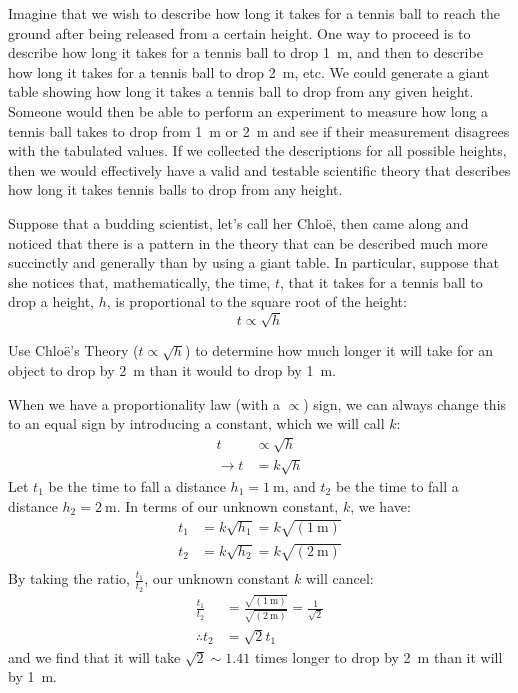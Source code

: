 Imagine that we wish to describe how long it takes for a tennis ball to reach the ground after being released from a certain height. One way to proceed is to describe how long it takes for a tennis ball to drop \SI{1}{\meter}, and then to describe how long it takes for a tennis ball to drop \SI{2}{\meter}, etc. We could generate a giant table showing how long it takes a tennis ball to drop from any given height. Someone would then be able to perform an experiment to measure how long a tennis ball takes to drop from \SI{1}{\meter} or \SI{2}{\meter} and see if their measurement disagrees with the tabulated values. If we collected the descriptions for all possible heights, then we would effectively have a valid and testable scientific theory that describes how long it takes tennis balls to drop from any height.

Suppose that a budding scientist, let's call her Chlo\"e, then came along and noticed that there is a pattern in the theory that can be described much more succinctly and generally than by using a giant table. In particular, suppose that she notices that, mathematically, the time, $t$, that it takes for a tennis ball to drop a height, $h$, is proportional to the square root of the height:
\begin{equation*}
t \propto \sqrt{h}
\end{equation*}

\begin{example}{Use Chlo\"e's Theory ($t \propto \sqrt{h}$) to determine how much longer it will take for an object to drop by \SI{2}{\meter} than it would to drop by \SI{1}{\meter}.}

When we have a proportionality law (with a $\propto$) sign, we can always change this to an equal sign by introducing a constant, which we will call $k$:
\begin{align*}
t &\propto \sqrt{h} \\
\rightarrow t&=k\sqrt{h}
\end{align*}
Let $t_1$ be the time to fall a distance $h_1=\SI{1}{\meter}$, and $t_2$ be the time to fall a distance $h_2=\SI{2}{\meter}$. In terms of our unknown constant, $k$, we have:
\begin{align*}
t_1 &=k\sqrt{h_1}=k \sqrt{(\SI{1}{\meter})}\\
t_2 &=k\sqrt{h_2}=k \sqrt{(\SI{2}{\meter})}\\
\end{align*}
By taking the ratio, $\frac{t_1}{t_2}$, our unknown constant $k$ will cancel:
\begin{align*}
\frac{t_1}{t_2}&=\frac{\sqrt{(\SI{1}{\meter})}}{\sqrt{(\SI{2}{\meter})}}=\frac{1}{\sqrt 2}\\
\therefore t_2 &= \sqrt{2} t_1
\end{align*}
and we find that it will take $\sqrt{2}\sim 1.41$ times longer to drop by \SI{2}{\meter} than it will by \SI{1}{\meter}.
\end{example}

